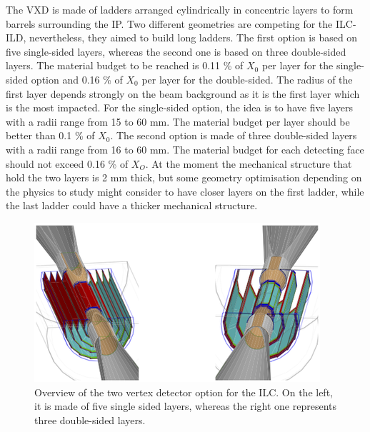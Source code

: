    The \gls{VXD} is made of ladders arranged cylindrically in concentric layers to form barrels surrounding the \gls{IP}.
   Two different geometries are competing for the \gls{ILC}-{ILD}, nevertheless, they aimed to build long ladders. 
   The first option is based on five single-sided layers, whereas the second one is based on three double-sided layers.
   The material budget to be reached is 0.11 \% of $X_0$ per layer for the single-sided option and 0.16 \% of $X_0$ per layer for the double-sided.
   The radius of the first layer depends strongly on the beam background as it is the first layer which is the most impacted.
   For the single-sided option, the idea is to have five layers with a radii range from 15 to 60 mm.
   The material budget per layer should be better than 0.1 \% of $X_0$.
   The second option is made of three double-sided layers with a radii range from 16 to 60 mm.
   The material budget for each detecting face should not exceed 0.16 \% of $X_O$.
   At the moment the mechanical structure that hold the two layers is 2 mm thick, but some geometry optimisation depending on the physics to study might consider to have closer layers on the first ladder, while the last ladder could have a thicker mechanical structure.
   
   \begin{figure}[!h]
     \centering
     \includegraphics[width = 10 cm]{Pictures/vxd/ild_VXD.png}
     \caption{Overview of the two vertex detector option for the ILC. On the left, it is made of five single sided layers, whereas the right one represents three double-sided layers.}
   \end{figure}
   

